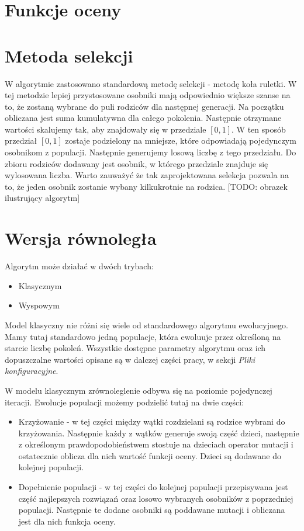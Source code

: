 \section{Funkcje oceny}


\section{Metoda selekcji}
W algorytmie zastosowano standardową metodę selekcji - metodę koła ruletki. W tej metodzie lepiej przystosowane osobniki mają odpowiednio większe 
szanse na to, że zostaną wybrane do puli rodziców dla następnej generacji. Na początku obliczana jest suma kumulatywna dla całego pokolenia. Następnie 
otrzymane wartości skalujemy tak, aby znajdowały się w przedziale $[0, 1]$. W ten sposób przedział $[0, 1]$ zostaje podzielony na mniejsze, które 
odpowiadają pojedynczym osobnikom z populacji. Następnie generujemy losową liczbę z tego przedziału. Do zbioru rodziców dodawany jest osobnik, 
w którego przedziale znajduje się wylosowana liczba. Warto zauważyć że tak zaprojektowana selekcja pozwala na to, że jeden osobnik zostanie wybany 
kilkukrotnie na rodzica.
[TODO: obrazek ilustrujący algorytm]

\section{Wersja równoległa}
Algorytm może działać w dwóch trybach:
\begin{itemize}
    \item Klasycznym
    \item Wyspowym
\end{itemize}

Model klasyczny nie różni się wiele od standardowego algorytmu ewolucyjnego. Mamy tutaj standardowo jedną populacje, która ewoluuje przez 
określoną na starcie liczbę pokoleń. Wszystkie dostępne parametry algorytmu oraz ich dopuszczalne wartości opisane są w dalczej części pracy, 
w sekcji \textit{Pliki konfiguracyjne}.

W modelu klasycznym zrównoleglenie odbywa się na poziomie pojedynczej iteracji. Ewolucje populacji możemy podzielić tutaj na dwie części:
\begin{itemize}
    \item Krzyżowanie - w tej części między wątki rozdzielani są rodzice wybrani do krzyżowania. Następnie każdy z wątków generuje swoją część 
    dzieci, następnie z określonym prawdopodobieństwem stostuje na dzieciach operator mutacji i ostatecznie oblicza dla nich wartość funkcji oceny. 
    Dzieci są dodawane do kolejnej populacji.
    \item Dopełnienie populacji - w tej części do kolejnej populacji przepisywana jest część najlepszych rozwiązań oraz losowo wybranych osobników 
    z poprzedniej populacji. Następnie te dodane osobniki są poddawane mutacji i obliczana jest dla nich funkcja oceny.
\end{itemize}

